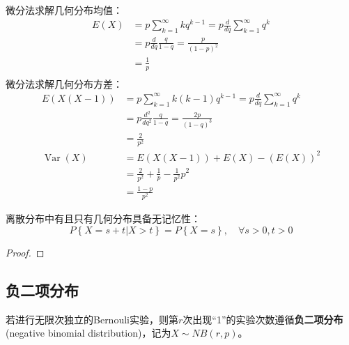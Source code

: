 \begin{note}
    微分法求解几何分布均值：
    \begin{align*}
        E(X) & =p\sum_{k=1}^{\infty}k q^{k-1}=p\frac{d}{d q}\sum_{k=1}^{\infty} q^{k} \\
             & =p\frac{d}{d q} \frac{q}{1-q} =\frac{p}{(1-p)^{2}}                     \\
             & =\frac{1}{p}                                                           \\
    \end{align*}
    微分法求解几何分布方差：
    \begin{align*}
        E(X(X-1))             & =p\sum_{k=1}^{\infty}k(k-1) q^{k-1}=p\frac{d}{d q}\sum_{k=1}^{\infty} q^{k} \\
                              & =p\frac{d^2}{d q^2} \frac{q}{1-q} =\frac{2p}{(1-q)^{3}}                     \\
                              & =\frac{2}{p^2}                                                              \\
        \operatorname{Var}(X) & =  E(X(X-1)) + E(X) - (E(X))^2                                              \\
                              & = \frac{2}{p^2} + \frac{1}{p} -\frac{1}{p^2} p^2                            \\
                              & = \frac{1-p}{p^2}
    \end{align*}
\end{note}

\begin{proposition}
    离散分布中有且只有几何分布具备无记忆性：
    \[ P\left\{ X=s+t|X>t \right\} =P\left\{ X=s \right\} ,\quad \forall s>0,t>0\]
\end{proposition}

\begin{proof}
\end{proof}

\subsection{负二项分布}

\begin{definition}
    若进行无限次独立的Bernouli实验，则第$r$次出现“1”的实验次数遵循\textbf{负二项分布}(negative binomial distribution)，记为$X \sim NB(r,p)$。
\end{definition}


